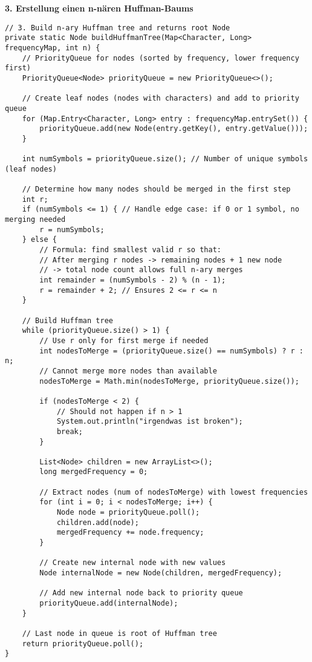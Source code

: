 \documentclass[a4paper,10pt,ngerman]{scrartcl}
\begin{document}
\textbf{3. Erstellung einen n-nären Huffman-Baums}
\begin{lstlisting}
// 3. Build n-ary Huffman tree and returns root Node
private static Node buildHuffmanTree(Map<Character, Long> frequencyMap, int n) {
    // PriorityQueue for nodes (sorted by frequency, lower frequency first)
    PriorityQueue<Node> priorityQueue = new PriorityQueue<>();

    // Create leaf nodes (nodes with characters) and add to priority queue
    for (Map.Entry<Character, Long> entry : frequencyMap.entrySet()) {
        priorityQueue.add(new Node(entry.getKey(), entry.getValue()));
    }

    int numSymbols = priorityQueue.size(); // Number of unique symbols (leaf nodes)

    // Determine how many nodes should be merged in the first step
    int r;
    if (numSymbols <= 1) { // Handle edge case: if 0 or 1 symbol, no merging needed
        r = numSymbols;
    } else {
        // Formula: find smallest valid r so that:
        // After merging r nodes -> remaining nodes + 1 new node
        // -> total node count allows full n-ary merges
        int remainder = (numSymbols - 2) % (n - 1);
        r = remainder + 2; // Ensures 2 <= r <= n
    }

    // Build Huffman tree
    while (priorityQueue.size() > 1) {
        // Use r only for first merge if needed
        int nodesToMerge = (priorityQueue.size() == numSymbols) ? r : n;
        // Cannot merge more nodes than available
        nodesToMerge = Math.min(nodesToMerge, priorityQueue.size()); 

        if (nodesToMerge < 2) {
            // Should not happen if n > 1
            System.out.println("irgendwas ist broken");
            break;
        }

        List<Node> children = new ArrayList<>();
        long mergedFrequency = 0;

        // Extract nodes (num of nodesToMerge) with lowest frequencies
        for (int i = 0; i < nodesToMerge; i++) {
            Node node = priorityQueue.poll();
            children.add(node);
            mergedFrequency += node.frequency;
        }

        // Create new internal node with new values
        Node internalNode = new Node(children, mergedFrequency);

        // Add new internal node back to priority queue
        priorityQueue.add(internalNode);
    }

    // Last node in queue is root of Huffman tree
    return priorityQueue.poll();
}
\end{lstlisting}
\end{document}
